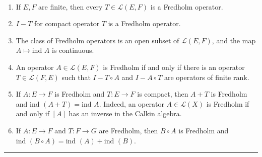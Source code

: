 \begin{exmp}
~\begin{enumerate}
\item If $E,F$ are finite, then every $T\in \mathcal{L}(E,F)$ is a Fredholm operator.
\item $I-T$ for compact operator $T$ is a Fredholm operator.
\item The class of Fredholm operators is an open subset of $\mathcal{L}(E,F)$, and the map $A\mapsto \textrm{ind } A$ is continuous.
\item An operator $A\in \mathcal{L}(E,F)$ is Fredholm if and only if there is an operator $T\in \mathcal{L}(F,E)$ such that $I-T\circ A$ and $I-A\circ T$ are operators of finite rank.

\item If $A:E\rightarrow F$ is Fredholm and $T:E\rightarrow F$ is compact, then $A+T$ is Fredholm and $\textrm{ind }(A+T)=\textrm{ind }A$. Indeed, an operator $A\in \mathcal{L}(X)$ is Fredholm if and only if $[A]$ has an inverse in the Calkin algebra.
\item If $A:E\rightarrow F$ and $T:F\rightarrow G$ are Fredholm, then $B\circ A$ is Fredholm and $\textrm{ind }(B\circ A) = \textrm{ind }(A)+\textrm{ind }(B)$.
\end{enumerate}
\end{exmp}

\noindent\rule{\textwidth}{1pt}
\newline